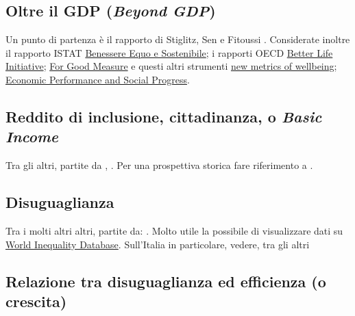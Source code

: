\documentclass[12pt]{article}
\begin{document}
\subsection{Oltre il GDP (\textit{Beyond GDP})}\label{sec:beyond-gdp}

Un punto di partenza \`e il rapporto di Stiglitz, Sen e Fitoussi
\citep{stiglitz_etal_beyond-gdp}. Considerate inoltre il rapporto ISTAT \href{https://www.istat.it/it/archivio/rapporto+bes}{Benessere Equo e Sostenibile}; i rapporti OECD
\href{http://www.oecd.org/statistics/better-life-initiative.htm}{Better
  Life Initiative};
\href{http://www.oecd.org/social/for-good-measure-9789264307278-en.htm}{For
  Good Measure} e questi altri strumenti
\href{https://www.project-syndicate.org/commentary/new-metrics-of-wellbeing-not-just-gdp-by-joseph-e-stiglitz-2018-12}{new
  metrics of wellbeing}; \href{https://www8.gsb.columbia.edu/faculty/jstiglitz/sites/jstiglitz/files/The%20Measurement%20of%20Economic%20Performance%20and%20Social%20Progress.pdf}{Economic Performance and Social Progress}.

  
\subsection{Reddito di inclusione, cittadinanza, o \textit{Basic Income}}\label{sec:basic-income}

Tra gli altri, partite da \cite{toso_2016},
\cite{vanparijs_2017_basic-income}. Per una prospettiva storica fare
riferimento a \cite{orsi_2018}.


\subsection{Disuguaglianza}\label{sec:inequality}

Tra i molti altri altri, partite da: \cite{atkinson_2010_top,
  piketty_2014_capital, piketty_2015_inequality, atkinson_2015,
  milanovic_2011_worlds, milanovic_2016_global}. Molto utile la
possibile di visualizzare dati su \href{https://wid.world/}{World
  Inequality Database}. Sull'Italia in particolare, vedere, tra gli
altri \cite{pianta_franzini_2016, pianta_2012_nove}


\subsection{Relazione tra disuguaglianza ed efficienza (o crescita)}\label{sec:inequality-growth}
\end{document}
